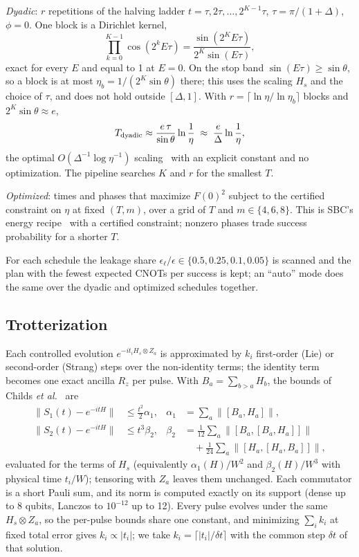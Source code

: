 \documentclass[aps,pra,twocolumn,superscriptaddress,nofootinbib]{revtex4-2}
\newcommand{\norm}[1]{\lVert#1\rVert}
\begin{document}
\emph{Dyadic}: $r$ repetitions of the halving ladder $t=\tau,2\tau,\dots,2^{K-1}\tau$, $\tau=\pi/(1+\Delta)$,
$\phi=0$. One block is a Dirichlet kernel,
\begin{equation}
\prod_{k=0}^{K-1}\cos(2^kE\tau)=\frac{\sin(2^KE\tau)}{2^K\sin(E\tau)},
\label{eq:dirichlet}
\end{equation}
exact for every $E$ and equal to 1 at $E=0$. On the stop band $\sin(E\tau)\ge\sin\theta$, so a block is at most
$\eta_b=1/(2^K\sin\theta)$ there; this uses the scaling $H_s$ and the choice of $\tau$, and does not hold outside
$[\Delta,1]$. With $r=\lceil\ln\eta/\ln\eta_b\rceil$ blocks and $2^K\sin\theta\approx e$,
\begin{equation}
T_{\rm dyadic}\approx\frac{e\,\tau}{\sin\theta}\ln\frac1\eta\;\approx\;\frac{e}{\Delta}\ln\frac1\eta ,
\end{equation}
the optimal $O(\Delta^{-1}\log\eta^{-1})$ scaling~\cite{Lin2020,CohenOh2023} with an explicit constant and no
optimization. The pipeline searches $K$ and $r$ for the smallest $T$.

\emph{Optimized}: times and phases that maximize $F(0)^2$ subject to the certified constraint on $\eta$ at fixed
$(T,m)$, over a grid of $T$ and $m\in\{4,6,8\}$. This is SBC's energy recipe~\cite{Stetcu2023} with a certified
constraint; nonzero phases trade success probability for a shorter $T$.

For each schedule the leakage share $\epsilon_\ell/\epsilon\in\{0.5,0.25,0.1,0.05\}$ is scanned and the plan with
the fewest expected CNOTs per success is kept; an ``auto'' mode does the same over the dyadic and optimized
schedules together.

\subsection{Trotterization}

Each controlled evolution $e^{-it_iH_s\otimes Z_a}$ is approximated by $k_i$ first-order (Lie) or second-order
(Strang) steps over the non-identity terms; the identity term becomes one exact ancilla $R_z$ per pulse. With
$B_a=\sum_{b>a}H_b$, the bounds of Childs \emph{et al.}~\cite[Props.~15--16]{Childs2021} are
\begin{align}
\norm{S_1(t)-e^{-itH}}&\le\tfrac{t^2}{2}\alpha_1,&\alpha_1&=\textstyle\sum_a\norm{[B_a,H_a]},\\
\norm{S_2(t)-e^{-itH}}&\le t^3\beta_2,&\beta_2&=\textstyle\frac1{12}\sum_a\norm{[B_a,[B_a,H_a]]}\nonumber\\
&&&\quad+\textstyle\frac1{24}\sum_a\norm{[H_a,[H_a,B_a]]},
\end{align}
evaluated for the terms of $H_s$ (equivalently $\alpha_1(H)/W^2$ and $\beta_2(H)/W^3$ with physical time $t_i/W$);
tensoring with $Z_a$ leaves them unchanged. Each commutator is a short Pauli sum, and its norm is computed exactly
on its support (dense up to 8 qubits, Lanczos to $10^{-12}$ up to 12). Every pulse evolves under the same
$H_s\otimes Z_a$, so the per-pulse bounds share one constant, and minimizing $\sum_ik_i$ at fixed total error gives
$k_i\propto|t_i|$; we take $k_i=\lceil|t_i|/\delta t\rceil$ with the common step $\delta t$ of that solution.
\end{document}
